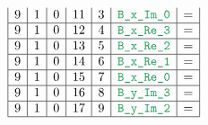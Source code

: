 \begin{figure}[h!]
\begin{adjustwidth}{-2cm}{-2cm}
{\[\begin{array}{|c|c|c|c|c|c|c|}
                    9                      & 1                                            & 0                                              & 11                     & 3                   & \locBXImZero         & =                                                                                                                                                                     \\ \hline
                    9                      & 1                                            & 0                                              & 12                     & 4                   & \locBXReThree        & =                                                                                                                                                                     \\ \hline
                    9                      & 1                                            & 0                                              & 13                     & 5                   & \locBXReTwo          & =                                                                                                                                                                     \\ \hline
                    9                      & 1                                            & 0                                              & 14                     & 6                   & \locBXReOne          & =                                                                                                                                                                     \\ \hline
                    9                      & 1                                            & 0                                              & 15                     & 7                   & \locBXReZero         & =                                                                                                                                                                     \\ \hline
                    9                      & 1                                            & 0                                              & 16                     & 8                   & \locBYImThree        & =                                                                                                                                                                     \\ \hline
                    9                      & 1                                            & 0                                              & 17                     & 9                   & \locBYImTwo          & =                                                                                                                                                                     \\ \hline

\end{array}\]}
\end{adjustwidth}
\end{figure}

